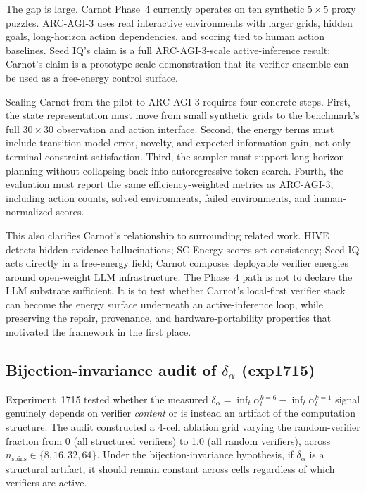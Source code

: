 \documentclass[10pt]{article}
\begin{document}
The gap is large. Carnot Phase~4 currently operates on ten
synthetic $5\times5$ proxy puzzles. ARC-AGI-3 uses real interactive
environments with larger grids, hidden goals, long-horizon action
dependencies, and scoring tied to human action baselines. Seed IQ's
claim is a full ARC-AGI-3-scale active-inference result; Carnot's
claim is a prototype-scale demonstration that its verifier ensemble
can be used as a free-energy control surface.

Scaling Carnot from the pilot to ARC-AGI-3 requires four concrete
steps. First, the state representation must move from small
synthetic grids to the benchmark's full $30\times30$ observation and
action interface. Second, the energy terms must include transition
model error, novelty, and expected information gain, not only
terminal constraint satisfaction. Third, the sampler must support
long-horizon planning without collapsing back into autoregressive
token search. Fourth, the evaluation must report the same
efficiency-weighted metrics as ARC-AGI-3, including action counts,
solved environments, failed environments, and human-normalized
scores.

This also clarifies Carnot's relationship to surrounding related
work. HIVE~\cite{hive2026} detects hidden-evidence hallucinations;
SC-Energy scores set consistency; Seed IQ acts directly in a
free-energy field; Carnot composes deployable verifier energies
around open-weight LLM infrastructure. The Phase~4 path is not to
declare the LLM substrate sufficient. It is to test whether Carnot's
local-first verifier stack can become the energy surface underneath
an active-inference loop, while preserving the repair, provenance,
and hardware-portability properties that motivated the framework in
the first place.

\subsection{Bijection-invariance audit of $\delta_\alpha$ (exp1715)}
\label{sec:phase4-bijection-invariance}

Experiment~1715 tested whether the measured $\delta_\alpha = \inf_t \alpha_t^{k=6} - \inf_t \alpha_t^{k=1}$ signal
genuinely depends on verifier \emph{content} or is instead an artifact of the computation structure.
The audit constructed a 4-cell ablation grid varying the random-verifier fraction from 0 (all structured
verifiers) to 1.0 (all random verifiers), across $n_{\mathrm{spins}} \in \{8, 16, 32, 64\}$.
Under the bijection-invariance hypothesis, if $\delta_\alpha$ is a structural artifact,
it should remain constant across cells regardless of which verifiers are active.
\end{document}
